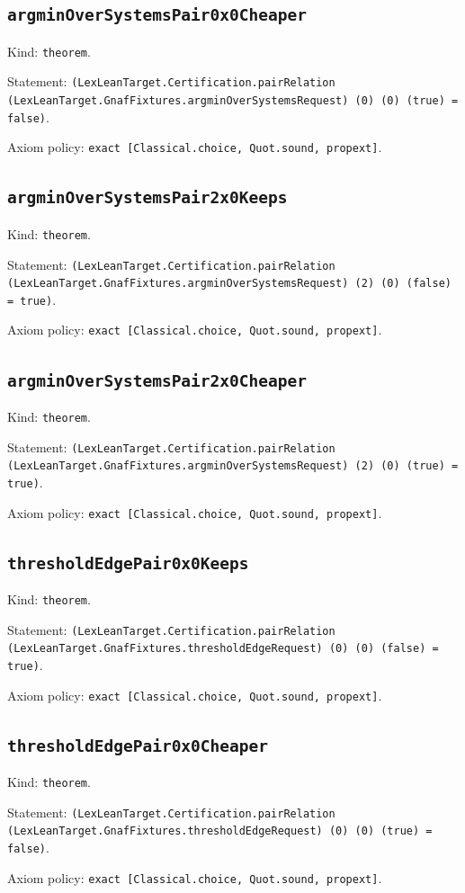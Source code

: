 \documentclass[11pt]{article}
\begin{document}
\subsection*{\texttt{argminOverSystemsPair0x0Cheaper}}
\noindent Kind: \texttt{theorem}.\par
\noindent Statement: \texttt{(LexLeanTarget.Certification.pairRelation (LexLeanTarget.GnafFixtures.argminOverSystemsRequest) (0) (0) (true) = false)}.\par
\noindent Axiom policy: \texttt{exact [Classical.choice, Quot.sound, propext]}.\par
\subsection*{\texttt{argminOverSystemsPair2x0Keeps}}
\noindent Kind: \texttt{theorem}.\par
\noindent Statement: \texttt{(LexLeanTarget.Certification.pairRelation (LexLeanTarget.GnafFixtures.argminOverSystemsRequest) (2) (0) (false) = true)}.\par
\noindent Axiom policy: \texttt{exact [Classical.choice, Quot.sound, propext]}.\par
\subsection*{\texttt{argminOverSystemsPair2x0Cheaper}}
\noindent Kind: \texttt{theorem}.\par
\noindent Statement: \texttt{(LexLeanTarget.Certification.pairRelation (LexLeanTarget.GnafFixtures.argminOverSystemsRequest) (2) (0) (true) = true)}.\par
\noindent Axiom policy: \texttt{exact [Classical.choice, Quot.sound, propext]}.\par
\subsection*{\texttt{thresholdEdgePair0x0Keeps}}
\noindent Kind: \texttt{theorem}.\par
\noindent Statement: \texttt{(LexLeanTarget.Certification.pairRelation (LexLeanTarget.GnafFixtures.thresholdEdgeRequest) (0) (0) (false) = true)}.\par
\noindent Axiom policy: \texttt{exact [Classical.choice, Quot.sound, propext]}.\par
\subsection*{\texttt{thresholdEdgePair0x0Cheaper}}
\noindent Kind: \texttt{theorem}.\par
\noindent Statement: \texttt{(LexLeanTarget.Certification.pairRelation (LexLeanTarget.GnafFixtures.thresholdEdgeRequest) (0) (0) (true) = false)}.\par
\noindent Axiom policy: \texttt{exact [Classical.choice, Quot.sound, propext]}.\par
\end{document}
